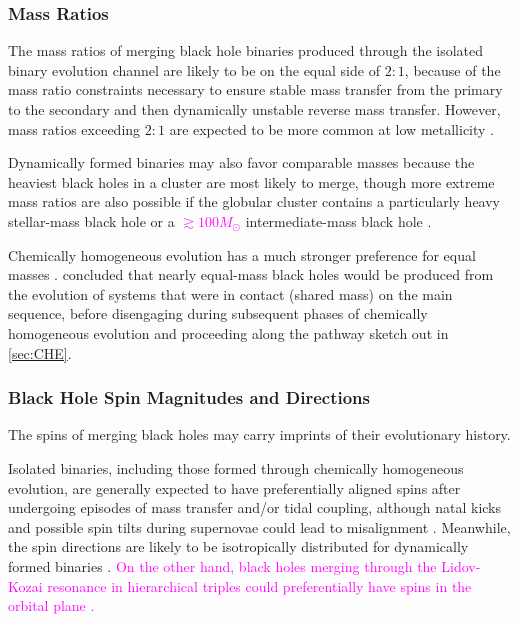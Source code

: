 \documentclass[iop,onecolumn]{revtex4}
\newcommand{\ilya}[1]{\textcolor{magenta}{#1}}
\begin{document}
\subsubsection{Mass Ratios}
The mass ratios of merging black hole binaries produced through the isolated binary evolution channel are likely to be on the equal side of $2:1$, because of the mass ratio constraints necessary to ensure stable mass transfer from the primary to the secondary and then dynamically unstable reverse mass transfer. However, mass ratios exceeding $2:1$ are expected to be more common at low metallicity \citep{Dominik:2012,Stevenson:2017}.

Dynamically formed binaries may also favor comparable masses because the heaviest black holes in a cluster are most likely to merge, though more extreme mass ratios are also possible if the globular cluster contains a particularly heavy stellar-mass black hole or a \ilya{$\gtrsim 100 M_\odot$} intermediate-mass black hole \citep{Mandel:2008,Belczynski:2014VMS}. 

Chemically homogeneous evolution has a much stronger preference for equal masses \citep{MandeldeMink:2016}.  \citep{Marchant:2016} concluded that nearly equal-mass black holes would be produced from the evolution of systems that were in contact (shared mass) on the main sequence, before disengaging during subsequent phases of chemically homogeneous evolution and proceeding along the pathway sketch out in \autoref{sec:CHE}. 

\subsubsection{Black Hole Spin Magnitudes and Directions}
The spins of merging black holes may carry imprints of their evolutionary history. 

Isolated binaries, including those formed through chemically homogeneous evolution, are generally expected to have preferentially aligned spins after undergoing episodes of mass transfer and/or tidal coupling, although natal kicks and possible spin tilts during supernovae could lead to misalignment \citep[e.g.,][]{Farr:2011,Tauris:2017}.  Meanwhile, the spin directions are likely to be isotropically distributed for dynamically formed binaries \citep[e.g.,][]{Rodriguez:2016spin}.  \ilya{On the other hand, black holes merging through the Lidov-Kozai resonance in hierarchical triples could preferentially have spins in the orbital plane \citep{LiuLai:2018}.}
\end{document}
